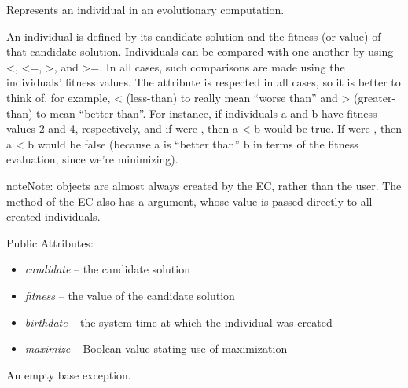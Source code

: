 \documentclass[letterpaper,10pt,english]{sphinxmanual}
\begin{document}
\begin{fulllineitems}
\label{reference:inspyred.ec.Individual}
Represents an individual in an evolutionary computation.

An individual is defined by its candidate solution and the
fitness (or value) of that candidate solution. Individuals
can be compared with one another by using \textless{}, \textless{}=, \textgreater{}, and \textgreater{}=.
In all cases, such comparisons are made using the individuals'
fitness values. The  attribute is respected in all
cases, so it is better to think of, for example, \textless{} (less-than)
to really mean ``worse than'' and \textgreater{} (greater-than) to mean
``better than''. For instance, if individuals a and b have fitness
values 2 and 4, respectively, and if  were ,
then a \textless{} b would be true. If  were , then 
a \textless{} b would be false (because a is ``better than'' b in terms of
the fitness evaluation, since we're minimizing).

\begin{notice}{note}{Note:}
 objects are almost always created by the EC, 
rather than the user. The  method of the EC also 
has a  argument, whose value is passed directly 
to all created individuals.
\end{notice}

Public Attributes:
\begin{itemize}
\item {} 
\emph{candidate} -- the candidate solution

\item {} 
\emph{fitness} -- the value of the candidate solution

\item {} 
\emph{birthdate} -- the system time at which the individual was created

\item {} 
\emph{maximize} -- Boolean value stating use of maximization

\end{itemize}

\end{fulllineitems}


\begin{fulllineitems}
\label{reference:inspyred.ec.Error}
An empty base exception.

\end{fulllineitems}
\end{document}
